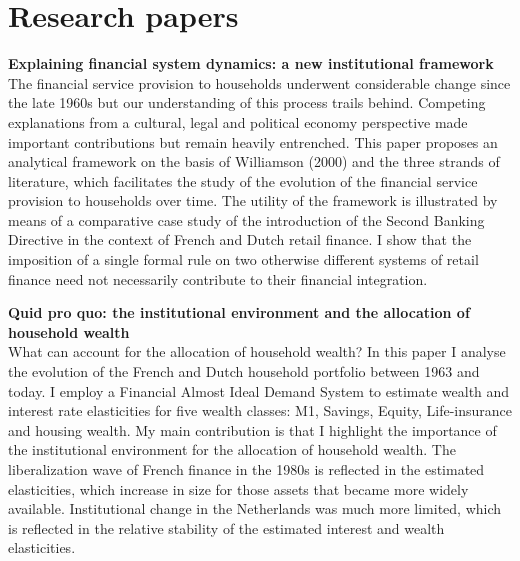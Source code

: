 \documentclass[9pt]{article}
\begin{document}
\section*{Research papers} \vspace{-7pt}	
\noindent \textbf{Explaining financial system dynamics: a new institutional framework} \\
The financial service provision to households underwent considerable change since the late 1960s but our understanding of this process trails behind. Competing explanations from a cultural, legal and political economy perspective made important contributions but remain heavily entrenched. This paper proposes an analytical framework on the basis of Williamson (2000) and the three strands of literature, which facilitates the study of the evolution of the financial service provision to households over time. The utility of the framework is illustrated by means of a comparative case study of the introduction of the Second Banking Directive in the context of French and Dutch retail finance. I show that the imposition of a single formal rule on two otherwise different systems of retail finance need not necessarily contribute to their financial integration.\\ \vspace{-5pt}	

\noindent \textbf{Quid pro quo: the institutional environment and the allocation of household wealth} \\
What can account for the allocation of household wealth? In this paper I analyse the evolution of the French and Dutch household portfolio between 1963 and today. I employ a Financial Almost Ideal Demand System to estimate wealth and interest rate elasticities for five wealth classes: M1, Savings, Equity, Life-insurance and housing wealth. My main contribution is that I highlight the importance of the institutional environment for the allocation of household wealth. The liberalization wave of French finance in the 1980s is reflected in the estimated elasticities, which increase in size for those assets that became more widely available. Institutional change in the Netherlands was much more limited, which is reflected in the relative stability of the estimated interest and wealth elasticities. \vspace{-5pt}	
\end{document}
